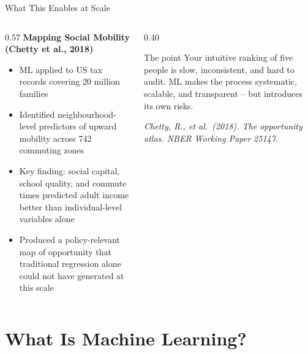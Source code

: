 \documentclass[aspectratio=169, 10pt]{beamer}
\begin{document}
\begin{frame}{What This Enables at Scale}
\begin{columns}[T]
\begin{column}{0.57\textwidth}
\textbf{Mapping Social Mobility (Chetty et al., 2018)}
\begin{itemize}
  \setlength\itemsep{0.35em}
  \item ML applied to US tax records covering 20 million families
  \item Identified neighbourhood-level predictors of upward mobility across 742 commuting zones
  \item Key finding: social capital, school quality, and commute times predicted adult income better than individual-level variables alone
  \item Produced a policy-relevant map of opportunity that traditional regression alone could not have generated at this scale
\end{itemize}
\end{column}
\begin{column}{0.40\textwidth}
\begin{alertblock}{The point}
Your intuitive ranking of five people is slow, inconsistent, and hard to audit. ML makes the process systematic, scalable, and transparent -- but introduces its own risks.
\end{alertblock}
\vspace{0.5em}
\small\textit{Chetty, R., et al.\ (2018). The opportunity atlas. NBER Working Paper 25147.}
\end{column}
\end{columns}
\end{frame}

\section{What Is Machine Learning?}
\end{document}
